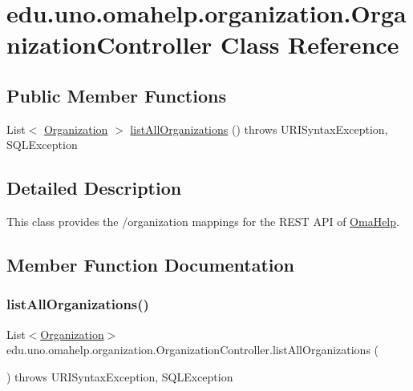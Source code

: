 \hypertarget{classedu_1_1uno_1_1omahelp_1_1organization_1_1_organization_controller}{}\section{edu.\+uno.\+omahelp.\+organization.\+Organization\+Controller Class Reference}
\label{classedu_1_1uno_1_1omahelp_1_1organization_1_1_organization_controller}
\subsection*{Public Member Functions}
\begin{DoxyCompactItemize}
\item 
List$<$ \mbox{\hyperlink{classedu_1_1uno_1_1omahelp_1_1organization_1_1_organization}{Organization}} $>$ \mbox{\hyperlink{classedu_1_1uno_1_1omahelp_1_1organization_1_1_organization_controller_a9d32c7c921b6867f68bf89893822eb04}{list\+All\+Organizations}} ()  throws U\+R\+I\+Syntax\+Exception, S\+Q\+L\+Exception 
\end{DoxyCompactItemize}


\subsection{Detailed Description}
This class provides the /organization mappings for the R\+E\+ST A\+PI of \mbox{\hyperlink{classedu_1_1uno_1_1omahelp_1_1_oma_help}{Oma\+Help}}. 

\subsection{Member Function Documentation}
\mbox{\label{classedu_1_1uno_1_1omahelp_1_1organization_1_1_organization_controller_a9d32c7c921b6867f68bf89893822eb04}} 
\subsubsection{\texorpdfstring{list\+All\+Organizations()}{listAllOrganizations()}}
{\footnotesize\ttfamily List$<$\mbox{\hyperlink{classedu_1_1uno_1_1omahelp_1_1organization_1_1_organization}{Organization}}$>$ edu.\+uno.\+omahelp.\+organization.\+Organization\+Controller.\+list\+All\+Organizations (\begin{DoxyParamCaption}{ }\end{DoxyParamCaption}) throws U\+R\+I\+Syntax\+Exception, S\+Q\+L\+Exception}

